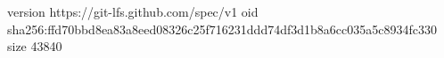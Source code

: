 version https://git-lfs.github.com/spec/v1
oid sha256:ffd70bbd8ea83a8eed08326c25f716231ddd74df3d1b8a6cc035a5c8934fc330
size 43840
